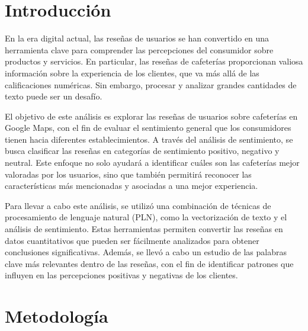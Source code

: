 \documentclass[journal]{IEEEtran}
\begin{document}



\section{Introducción}
% 
% 
% 
% 
\IEEEPARstart
{E}{n} la era digital actual, las reseñas de usuarios se han convertido en una herramienta clave para comprender las percepciones del consumidor sobre productos y servicios. En particular, las reseñas de cafeterías proporcionan valiosa información sobre la experiencia de los clientes, que va más allá de las calificaciones numéricas. Sin embargo, procesar y analizar grandes cantidades de texto puede ser un desafío.

El objetivo de este análisis es explorar las reseñas de usuarios sobre cafeterías en Google Maps, con el fin de evaluar el sentimiento general que los consumidores tienen hacia diferentes establecimientos. A través del análisis de sentimiento, se busca clasificar las reseñas en categorías de sentimiento positivo, negativo y neutral. Este enfoque no solo ayudará a identificar cuáles son las cafeterías mejor valoradas por los usuarios, sino que también permitirá reconocer las características más mencionadas y asociadas a una mejor experiencia.

Para llevar a cabo este análisis, se utilizó una combinación de técnicas de procesamiento de lenguaje natural (PLN), como la vectorización de texto y el análisis de sentimiento. Estas herramientas permiten convertir las reseñas en datos cuantitativos que pueden ser fácilmente analizados para obtener conclusiones significativas. Además, se llevó a cabo un estudio de las palabras clave más relevantes dentro de las reseñas, con el fin de identificar patrones que influyen en las percepciones positivas y negativas de los clientes.

\section{Metodología}
\end{document}
